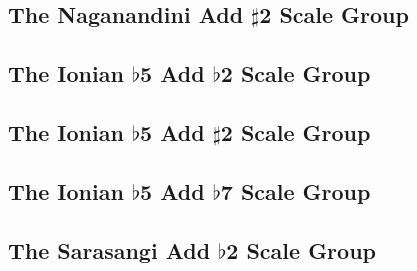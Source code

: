 \documentclass[english]{./gbook}
\begin{document}
\begin{large}
\subsection{The Naganandini Add $\sharp$2 Scale Group}

\subsection{The Ionian $\flat$5 Add $\flat$2 Scale Group}

\subsection{The Ionian $\flat$5 Add $\sharp$2 Scale Group}

\subsection{The Ionian $\flat$5 Add $\flat$7 Scale Group}

\subsection{The Sarasangi Add $\flat$2 Scale Group}


\end{large}
\end{document}
